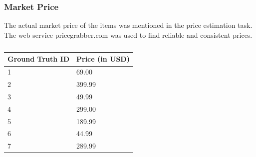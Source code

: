 \subsubsection{Market Price}
The actual market price of the items was mentioned in the price estimation task. The web service pricegrabber.com was used to find reliable and consistent prices. 
\begin{table}[h!]
	\begin{center}
	\begin{tabular}{| l | p{10cm} |}
		\hline
		Ground Truth ID & Price (in USD) \\
		\hline
		1 & 69.00 \\
		\hline
		2 & 399.99 \\
		\hline
		3 & 49.99 \\
		\hline
		4 & 299.00 \\
		\hline
		5 & 189.99 \\
		\hline
		6 & 44.99 \\
		\hline
		7 & 289.99 \\
		\hline
	\end{tabular}
	\end{center}
	\caption{}
\end{table}
